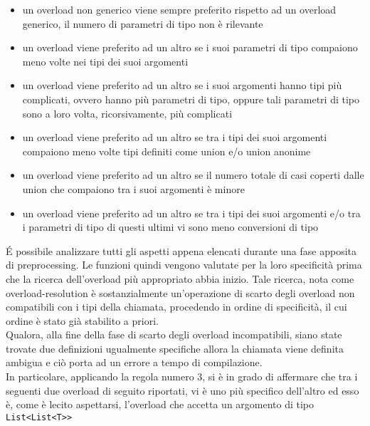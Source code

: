 \begin{itemize}
    \item{
        un overload non generico viene sempre preferito rispetto ad un overload generico, il 
        numero di parametri di tipo non è rilevante
    }
    \item{
        un overload viene preferito ad un altro se i suoi parametri di tipo compaiono 
        meno volte nei tipi dei suoi argomenti
    }
    \item{
        un overload viene preferito ad un altro se i suoi argomenti hanno tipi più complicati, 
        ovvero hanno più parametri di tipo, oppure tali parametri di tipo sono a loro volta, 
        ricorsivamente, più complicati
    }
    \item{
        un overload viene preferito ad un altro se tra i tipi dei suoi argomenti 
        compaiono meno volte tipi definiti come union e/o union anonime
    }
    \item{
        un overload viene preferito ad un altro se il numero totale di casi coperti dalle 
        union che compaiono tra i suoi argomenti è minore
    }
    \item{
        un overload viene preferito ad un altro se tra i tipi dei suoi argomenti e/o tra i 
        parametri di tipo di questi ultimi vi sono meno conversioni di tipo
    }
\end{itemize}

É possibile analizzare tutti gli aspetti appena elencati durante una fase apposita 
di preprocessing. Le funzioni quindi vengono valutate per la loro specificità 
prima che la ricerca dell’overload più appropriato abbia inizio. Tale ricerca, 
nota come overload-resolution è sostanzialmente un’operazione di scarto degli 
overload non compatibili con i tipi della chiamata, procedendo in ordine di specificità, 
il cui ordine è stato già stabilito a priori. \\

Qualora, alla fine della fase di scarto 
degli overload incompatibili, siano state trovate due definizioni ugualmente specifiche 
allora la chiamata viene definita ambigua e ciò porta ad un errore a tempo di compilazione. \\

In particolare, applicando la regola numero 3, si è in grado di affermare 
che tra i seguenti due overload di seguito riportati, vi è uno più specifico 
dell’altro ed esso è, come è lecito aspettarsi, l’overload che 
accetta un argomento di tipo \texttt{List<List<T>\>>}

